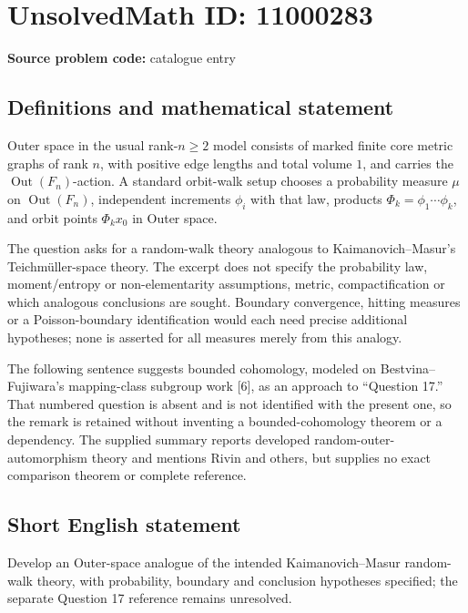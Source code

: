\documentclass[11pt]{article}
\begin{document}
\section*{UnsolvedMath ID: 11000283}
\textbf{Source problem code:} catalogue entry
\subsection{Definitions and mathematical statement}
Outer space in the usual rank-\(n\geq2\) model consists of marked finite core metric graphs of rank \(n\), with positive edge lengths and total volume \(1\), and carries the \(\operatorname{Out}(F_n)\)-action. A standard orbit-walk setup chooses a probability measure \(\mu\) on \(\operatorname{Out}(F_n)\), independent increments \(\phi_i\) with that law, products \(\Phi_k=\phi_1\cdots\phi_k\), and orbit points \(\Phi_kx_0\) in Outer space.

The question asks for a random-walk theory analogous to Kaimanovich--Masur's Teichm\"uller-space theory. The excerpt does not specify the probability law, moment/entropy or non-elementarity assumptions, metric, compactification or which analogous conclusions are sought. Boundary convergence, hitting measures or a Poisson-boundary identification would each need precise additional hypotheses; none is asserted for all measures merely from this analogy.

The following sentence suggests bounded cohomology, modeled on Bestvina--Fujiwara's mapping-class subgroup work [6], as an approach to ``Question 17.'' That numbered question is absent and is not identified with the present one, so the remark is retained without inventing a bounded-cohomology theorem or a dependency. The supplied summary reports developed random-outer-automorphism theory and mentions Rivin and others, but supplies no exact comparison theorem or complete reference.
\subsection{Short English statement}
Develop an Outer-space analogue of the intended Kaimanovich--Masur random-walk theory, with probability, boundary and conclusion hypotheses specified; the separate Question 17 reference remains unresolved.
\end{document}
